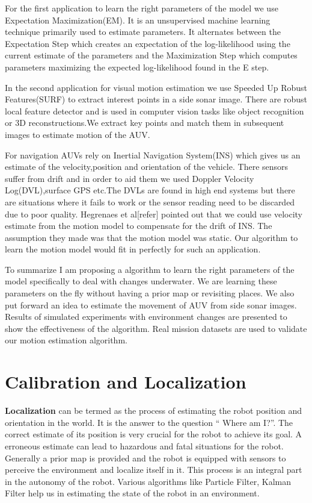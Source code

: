 \documentclass[12pt]{dalcsthesis}
\begin{document}
For the first application to learn the right parameters of the model we use Expectation Maximization(EM). It is an unsupervised machine learning technique primarily used to estimate parameters. It alternates between the Expectation Step which creates an expectation of the log-likelihood using the current estimate of the parameters and the Maximization Step which computes parameters maximizing the expected log-likelihood found in the E step. 

In the second application for visual motion estimation we use Speeded Up Robust Features(SURF) to extract interest points in a side sonar image. There are robust local feature detector and is used in computer vision tasks like object recognition or 3D reconstructions.We extract key points and match them in subsequent images to estimate motion of the AUV.

For navigation AUVs rely on Inertial Navigation System(INS) which gives us an estimate of the velocity,position and orientation of the vehicle. There sensors suffer from drift and in order to aid them we used Doppler Velocity Log(DVL),surface GPS etc.The DVLs are found in high end systems but there are situations where it fails to work or the sensor reading need to be discarded due to poor quality. Hegrenaes et al[refer] pointed out that we could use velocity estimate from the motion model to compensate for the drift of INS. The assumption they made was that the motion model was static. Our algorithm to learn the motion model would fit in perfectly for such an application. 

To summarize I am proposing a algorithm to learn the right parameters of the model specifically to deal with changes underwater. We are learning these parameters on the fly without having a prior map or revisiting places. We also put forward an idea to estimate the movement of AUV from side sonar images. Results of simulated experiments with environment changes are presented to show the effectiveness of the algorithm. Real mission datasets are used to validate our motion estimation algorithm. 
\section{Calibration and Localization}
\textbf{Localization} can be termed as the process of estimating the robot position and orientation in the world. It is the answer to the question “ Where am I?”. The correct estimate of its position is very crucial for the robot to achieve its goal. A erroneous estimate can lead to hazardous and fatal situations for the robot. Generally a prior map is provided and the robot is equipped with sensors to perceive the environment and localize itself in it. This process is an integral part in the autonomy of the robot. Various algorithms like Particle Filter, Kalman Filter help us in estimating the state of the robot in an environment. 
\end{document}
